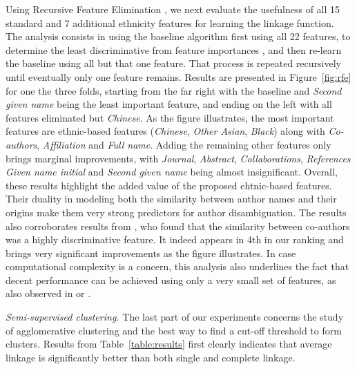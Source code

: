 \documentclass{article}
\begin{document}
Using Recursive Feature Elimination \cite{guyon2002gene}, we next evaluate the
usefulness of all 15 standard and 7 additional ethnicity features for learning
the linkage function. The analysis consists in using the baseline algorithm
first using all 22 features, to determine the least discriminative from feature
importances \citep{louppe2013understanding}, and then re-learn the baseline
using all but that one feature. That process is repeated recursively until
eventually only one feature remains. Results are presented in
Figure~\ref{fig:rfe} for one the three folds, starting from the far right with
the baseline and \textit{Second given name} being the least important feature,
and ending on the left with all features eliminated but \textit{Chinese}. As
the figure illustrates, the most important features are ethnic-based features
(\textit{Chinese}, \textit{Other Asian}, \textit{Black}) along with
\textit{Co-authors}, \textit{Affiliation} and \textit{Full name}. Adding the remaining
other features only brings marginal improvements, with \textit{Journal},
\textit{Abstract}, \textit{Collaborations}, \textit{References} \textit{Given
name initial} and \textit{Second given name} being almost insignificant.
Overall, these results highlight the added value of the proposed ehtnic-based
features. Their duality in modeling both the similarity between author names
and their origins make them very strong predictors for author disambiguation.
The results also corroborates results from \citep{ferreira2010effective}, who
found that the similarity between co-authors was a highly discriminative
feature. It indeed appears in 4th in our ranking and brings very significant
improvements as the figure illustrates. In case computational complexity is a concern, this analysis also
underlines the fact that decent performance can be achieved using only a very
small set of features, as also observed in
\citep{treeratpituk2009disambiguating} or \citep{levin2012citation}.

\textit{Semi-supervised clustering.} The last part of our experiments concerns
the study of agglomerative clustering and the best way to find a cut-off
threshold to form clusters. Results from Table~\ref{table:results}
first clearly indicates that average linkage is significantly better than
both single and complete linkage.
\end{document}

